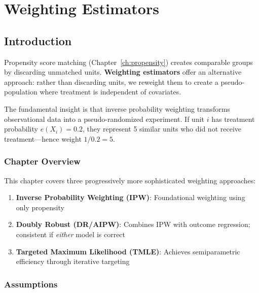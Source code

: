 \chapter{Weighting Estimators}
\label{ch:weighting}


\section{Introduction}
\label{sec:weighting_intro}

Propensity score matching (Chapter~\ref{ch:propensity}) creates comparable groups by discarding unmatched units. \textbf{Weighting estimators} offer an alternative approach: rather than discarding units, we reweight them to create a pseudo-population where treatment is independent of covariates.

The fundamental insight is that inverse probability weighting transforms observational data into a pseudo-randomized experiment. If unit $i$ has treatment probability $e(X_i) = 0.2$, they represent 5 similar units who did not receive treatment---hence weight $1/0.2 = 5$.

\subsection{Chapter Overview}

This chapter covers three progressively more sophisticated weighting approaches:

\begin{enumerate}
    \item \textbf{Inverse Probability Weighting (IPW)}: Foundational weighting using only propensity
    \item \textbf{Doubly Robust (DR/AIPW)}: Combines IPW with outcome regression; consistent if \emph{either} model is correct
    \item \textbf{Targeted Maximum Likelihood (TMLE)}: Achieves semiparametric efficiency through iterative targeting
\end{enumerate}

\subsection{Assumptions}

